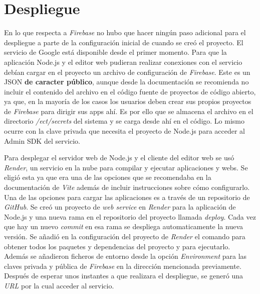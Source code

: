 \begin{table}[H]
\label{FIX-09}
\end{table}

\section{Despliegue}

En lo que respecta a \textit{Firebase} no hubo que hacer ningún paso adicional para el despliegue a parte de la configuración inicial de cuando se creó el proyecto. El servicio de Google está disponible desde el primer momento. Para que la aplicación Node.js y el editor web pudieran realizar conexiones con el servicio debían cargar en el proyecto un archivo de configuración de \textit{Firebase}. Este es un JSON \textbf{de caracter público}, aunque desde la documentación se recomienda no incluir el contenido del archivo en el código fuente de proyectos de código abierto, ya que, en la mayoría de los casos los usuarios deben crear sus propios proyectos de \textit{Firebase} para dirigir sus apps ahí. Es por ello que se almacena el archivo en el directorio \textit{/ect/secrets} del sistema y se carga desde ahí en el código. Lo mismo ocurre con la clave privada que necesita el proyecto de Node.js para acceder al Admin SDK del servicio.

Para desplegar el servidor web de Node.js y el cliente del editor web se usó \textit{Render}\cite{render}, un servicio en la nube para compilar y ejecutar aplicaciones y webs. Se eligió esta ya que era una de las opciones que se recomendaba en la documentación de \textit{Vite}\cite{vite} además de incluir instrucciones sobre cómo configurarlo. Una de las opciones para cargar las aplicaciones es a través de un repositorio de \textit{GitHub}. Se creó un proyecto de \textit{web service} en \textit{Render} para la aplicación de Node.js y una nueva rama en el repositorio del proyecto llamada \textit{deploy}. Cada vez que hay un nuevo \textit{commit} en esa rama se despliega automaticamente la nueva versión. Se añadió en la configuración del proyecto de \textit{Render} el comando  para obtener todos los paquetes y dependencias del proyecto y   para ejecutarlo. Además se añadieron ficheros de entorno desde la opción \textit{Environment} para las claves privada y pública de \textit{Firebase} en la dirección mencionada previamente. Después de esperar unos instantes a que realizara el despliegue, se generó una \textit{URL} por la cual acceder al servicio.

